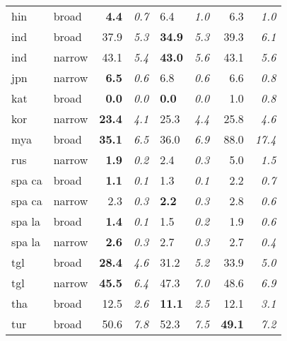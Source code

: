 {\begin{tabularx}{1.2\textwidth}{|l|X||r|r||X|X||r|r|}
hin       & broad         & \textbf{4.4} & \textit{0.7}    & 6.4          & \textit{1.0}          & 6.3    & \textit{1.0}    \\
ind       & broad         & 37.9         & \textit{5.3}    & \textbf{34.9}& \textit{5.3}          & 39.3   & \textit{6.1}    \\
ind       & narrow        & 43.1         & \textit{5.4}    & \textbf{43.0}& \textit{5.6}          & 43.1   & \textit{5.6}    \\
jpn       & narrow        & \textbf{6.5} & \textit{0.6}    & 6.8          & \textit{0.6}          & 6.6    & \textit{0.8}    \\
kat       & broad         & \textbf{0.0} & \textit{0.0}    & \textbf{0.0} & \textit{0.0}          & 1.0    & \textit{0.8}    \\
kor       & narrow        & \textbf{23.4}& \textit{4.1}    & 25.3         & \textit{4.4}          & 25.8   & \textit{4.6}    \\
mya       & broad         & \textbf{35.1}& \textit{6.5}    & 36.0         & \textit{6.9}          & 88.0   & \textit{17.4}   \\
rus       & narrow        & \textbf{1.9} & \textit{0.2}    & 2.4          & \textit{0.3}          & 5.0    & \textit{1.5}    \\
spa ca    & broad         & \textbf{1.1} & \textit{0.1}    & 1.3          & \textit{0.1}          & 2.2    & \textit{0.7}    \\
spa ca    & narrow        & 2.3          & \textit{0.3}    & \textbf{2.2}          & \textit{0.3}          & 2.8    & \textit{0.6}    \\
spa la    & broad         & \textbf{1.4} & \textit{0.1}    & 1.5          & \textit{0.2}          & 1.9    & \textit{0.6}    \\
spa la    & narrow        & \textbf{2.6} & \textit{0.3}    & 2.7          & \textit{0.3}          & 2.7    & \textit{0.4}    \\
tgl       & broad         & \textbf{28.4}& \textit{4.6}    & 31.2         & \textit{5.2}          & 33.9   & \textit{5.0}    \\
tgl       & narrow        & \textbf{45.5}& \textit{6.4}    & 47.3         & \textit{7.0}          & 48.6   & \textit{6.9}    \\
tha       & broad         & 12.5         & \textit{2.6}    & \textbf{11.1}         & \textit{2.5}          & 12.1   & \textit{3.1}    \\
tur       & broad         & 50.6         & \textit{7.8}    & 52.3         & \textit{7.5}          & \textbf{49.1}   & \textit{7.2}    \\

\end{tabularx}}
